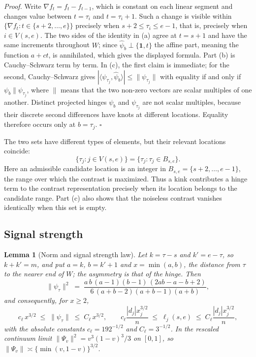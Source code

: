 \documentclass[12pt, a4paper]{article}
\newcommand{\qed}{\hfill$\square$}
\newenvironment{proof}[1][Proof]{\par\noindent\textit{#1.}\space}{\qed\par\medskip}
\newtheorem{lemma}{Lemma}[section]
\begin{document}
\begin{proof}
Write $\nabla f_t = f_t - f_{t-1}$, which is constant on each linear segment
and changes value between $t = \tau_i$ and $t = \tau_i+1$. Such a change is
visible within $\{\nabla f_t : t \in \{s+2,\ldots,e\}\}$ precisely when
$s+2 \le \tau_i \le e-1$, that is, precisely when $i \in V(s,e)$. The two sides
of the identity in (a) agree at $t = s+1$ and have the same increments
throughout $W$; since $\hat\psi_b \perp \{\mathbf 1, t\}$ the affine part,
meaning the function $a+ct$, is annihilated, which gives the displayed formula.
Part (b) is Cauchy--Schwarz
term by term. In (c), the first claim is immediate; for the second,
Cauchy--Schwarz gives $|\langle \psi_{\tau_j},\hat\psi_b\rangle| \le
\|\psi_{\tau_j}\|$ with equality if and only if $\psi_b \parallel
\psi_{\tau_j}$, where $\parallel$ means that the two non-zero vectors are
scalar multiples of one another. Distinct projected hinges $\psi_b$ and
$\psi_{\tau_j}$ are not scalar multiples, because their discrete second
differences have knots at different locations. Equality therefore occurs only
at $b=\tau_j$.
\end{proof}

The two sets have different types of elements, but their relevant locations
coincide:
\[
\{\tau_j:j\in V(s,e)\}=\{\tau_j:\tau_j\in B_{s,e}\}.
\]
Here an admissible candidate location is an integer in
$B_{s,e}=\{s+2,\ldots,e-1\}$, the range over which the contrast is maximized.
Thus a kink contributes a hinge term to the contrast representation precisely
when its location belongs to the candidate range. Part (c) also shows that the
noiseless contrast vanishes identically when this set is empty.

\subsection{Signal strength}

\begin{lemma}[Norm and signal strength law]
\label{lem:lev}
Let $k = \tau - s$ and $k' = e - \tau$, so $k+k' = m$, and put $a = k$, $b = k'+1$ and $x = \min(a,b)$, the distance from $\tau$ to the nearer end of $W$; the asymmetry is that of the hinge. Then \begin{equation} \label{eq:normexact} \|\psi_\tau\|^2 \;=\; \frac{a\,b\,(a-1)(b-1)\,(2ab-a-b+2)}{6\,(a+b-2)(a+b-1)(a+b)} , \end{equation} and consequently, for $x \ge 2$, \begin{equation} \label{eq:sup_levlaw} c_\ell\, x^{3/2} \;\le\; \|\psi_\tau\| \;\le\; C_\ell\, x^{3/2}, \qquad c_\ell \frac{|d_j| x_j^{3/2}}{n} \;\le\; \ell_j(s,e) \;\le\; C_\ell \frac{|d_j| x_j^{3/2}}{n} , \end{equation} with the absolute constants $c_\ell = 192^{-1/2}$ and $C_\ell = 3^{-1/2}$.
In the rescaled continuum limit $\|\Psi_v\|^2 = v^3(1-v)^3/3$ on $[0,1]$, so
$\|\Psi_v\| \asymp \{\min(v,1-v)\}^{3/2}$.
\end{lemma}
\end{document}
